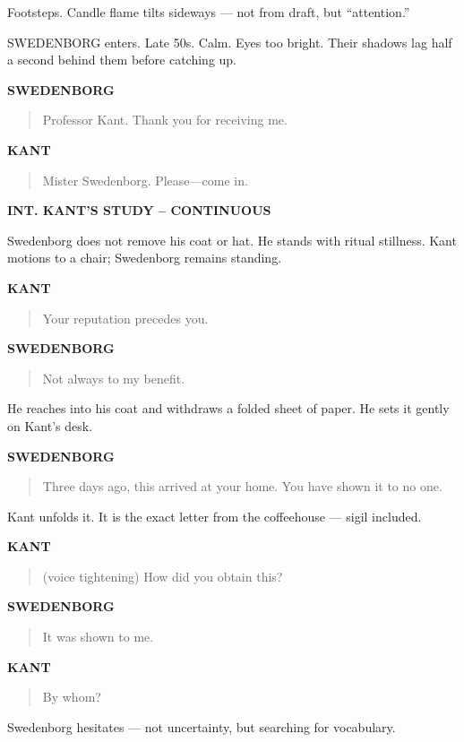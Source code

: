 \documentclass[12pt]{article}
\newcommand{\Scene}[1]{\vspace{1.2em}\textbf{#1}\vspace{0.8em}}
\newcommand{\Character}[1]{\vspace{0.8em}\textbf{#1}\vspace{0.4em}}
\newenvironment{Dialogue}{\begin{quote}\begin{RaggedRight}}{\end{RaggedRight}\end{quote}}
\newcommand{\Action}[1]{\vspace{0.4em}#1\vspace{0.4em}}
\begin{document}
\Action{Footsteps. Candle flame tilts sideways — not from draft, but “attention.”}

\Action{SWEDENBORG enters. Late 50s. Calm. Eyes too bright.  
Their shadows lag half a second behind them before catching up.}

\Character{SWEDENBORG}
\begin{Dialogue}
Professor Kant. Thank you for receiving me.
\end{Dialogue}

\Character{KANT}
\begin{Dialogue}
Mister Swedenborg. Please—come in.
\end{Dialogue}

\Scene{INT. KANT’S STUDY – CONTINUOUS}

\Action{Swedenborg does not remove his coat or hat. He stands with ritual stillness. Kant motions to a chair; Swedenborg remains standing.}

\Character{KANT}
\begin{Dialogue}
Your reputation precedes you.
\end{Dialogue}

\Character{SWEDENBORG}
\begin{Dialogue}
Not always to my benefit.
\end{Dialogue}

\Action{He reaches into his coat and withdraws a folded sheet of paper.  
He sets it gently on Kant’s desk.}

\Character{SWEDENBORG}
\begin{Dialogue}
Three days ago, this arrived at your home.  
You have shown it to no one.
\end{Dialogue}

\Action{Kant unfolds it.  
It is the exact letter from the coffeehouse — sigil included.}

\Character{KANT}
\begin{Dialogue}
(voice tightening)  
How did you obtain this?
\end{Dialogue}

\Character{SWEDENBORG}
\begin{Dialogue}
It was shown to me.
\end{Dialogue}

\Character{KANT}
\begin{Dialogue}
By whom?
\end{Dialogue}

\Action{Swedenborg hesitates — not uncertainty, but searching for vocabulary.}
\end{document}
